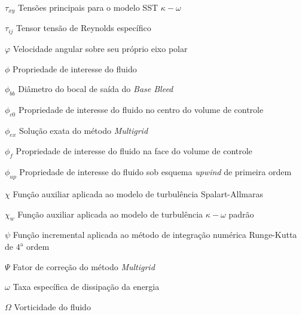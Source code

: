 \begin{simbolos}
  \item[\(\tau_{xy}\)] Tensões principais para o modelo SST $\kappa-\omega$
  \item[\(\tau_{ij}\)] Tensor tensão de Reynolds específico
  \item[\(\varphi\)] Velocidade angular sobre seu próprio eixo polar
  \item[\(\phi\)] Propriedade de interesse do fluido
  \item[\(\phi_{bb}\)] Diâmetro do bocal de saída do \textit{Base Bleed}
  \item[\(\phi_{c0}\)] Propriedade de interesse do fluido no centro do volume de controle
  \item[\(\phi_{ex}\)] Solução exata do método \textit{Multigrid}
  \item[\(\phi_f\)] Propriedade de interesse do fluido na face do volume de controle
  \item[\(\phi_{up}\)] Propriedade de interesse do fluido sob esquema \textit{upwind} de primeira ordem
  \item[\(\chi\)] Função auxiliar aplicada ao modelo de turbulência Spalart-Allmaras
  \item[\(\chi_w\)] Função auxiliar aplicada ao modelo de turbulência $\kappa-\omega$ padrão
  \item[\(\psi\)] Função incremental aplicada ao método de integração numérica Runge-Kutta de $4^\text{a}$ ordem
  \item[\(\Psi\)] Fator de correção do método \textit{Multigrid}
  \item[\(\omega\)] Taxa específica de dissipação da energia
  \item[\(\Omega\)] Vorticidade do fluido
\end{simbolos}